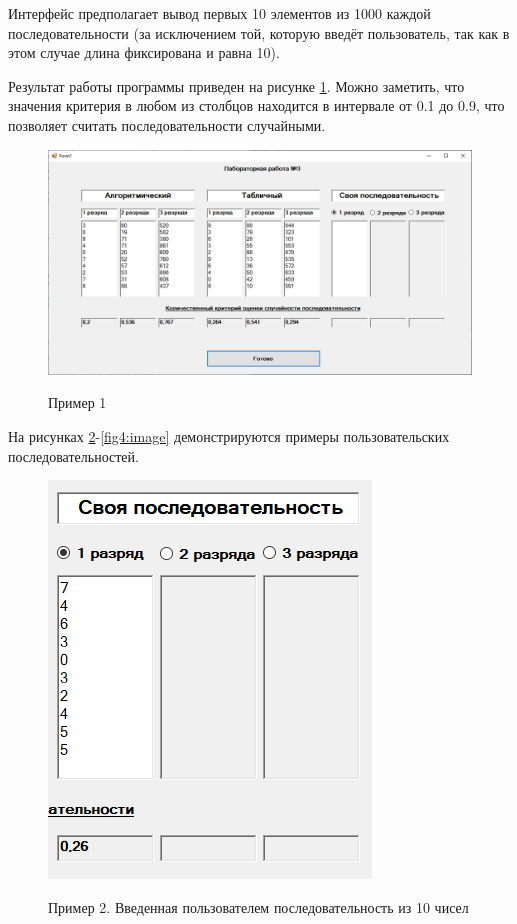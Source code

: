 Интерфейс предполагает вывод первых 10 элементов из 1000 каждой последовательности (за исключением той, которую введёт пользователь, так как в этом случае длина фиксирована и равна 10). 

Результат работы программы приведен на рисунке \ref{fig1:image}. Можно заметить, что значения критерия в любом из столбцов находится в интервале от 0.1 до 0.9, что позволяет считать последовательности случайными.

\begin{figure}[h]
	\begin{center}
		{\includegraphics[scale = 0.55]{img/ex1.png}}
		\caption{Пример 1}
		\label{fig1:image}
	\end{center}
\end{figure}

На рисунках \ref{fig2:image}-\ref{fig4:image} демонстрируются примеры пользовательских последовательностей.

\begin{figure}[h]
	\begin{center}
		{\includegraphics[scale = 0.55]{img/ex4.png}}
		\caption{Пример 2. Введенная пользователем последовательность из 10 чисел}
		\label{fig2:image}
	\end{center}
\end{figure}

